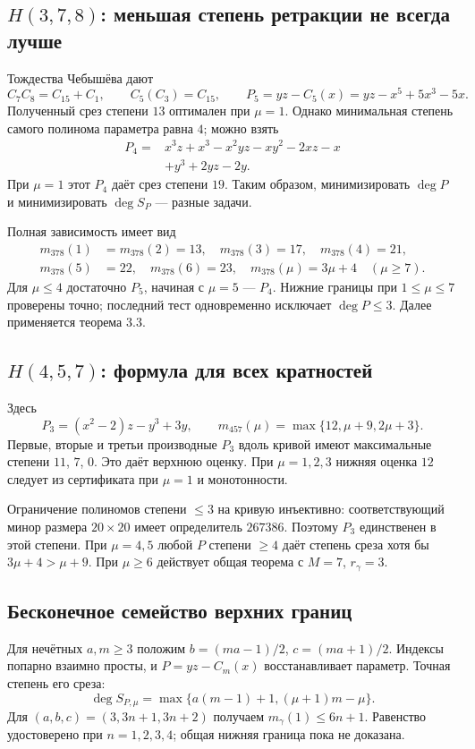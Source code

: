 \subsection*{$H(3,7,8)$: меньшая степень ретракции не всегда лучше}
Тождества Чебышёва дают
\[
C_7C_8=C_{15}+C_1,\qquad C_5(C_3)=C_{15},\qquad
P_5=yz-C_5(x)=yz-x^5+5x^3-5x.
\]
Полученный срез степени $13$ оптимален при $\mu=1$. Однако минимальная степень самого полинома параметра равна $4$; можно взять
\[
\begin{split}
P_4={}&x^3z+x^3-x^2yz-xy^2-2xz-x\\
&+y^3+2yz-2y.
\end{split}
\]
При $\mu=1$ этот $P_4$ даёт срез степени $19$. Таким образом, минимизировать $\deg P$ и минимизировать $\deg S_P$ --- разные задачи.

Полная зависимость имеет вид
\[
\boxed{\begin{aligned}
m_{378}(1)&=m_{378}(2)=13,\quad m_{378}(3)=17,\quad m_{378}(4)=21,\\
m_{378}(5)&=22,\quad m_{378}(6)=23,\quad
m_{378}(\mu)=3\mu+4\quad(\mu\ge7).
\end{aligned}}
\]
Для $\mu\le4$ достаточно $P_5$, начиная с $\mu=5$ --- $P_4$. Нижние границы при $1\le\mu\le7$ проверены точно; последний тест одновременно исключает $\deg P\le3$. Далее применяется теорема 3.3.

\subsection*{$H(4,5,7)$: формула для всех кратностей}
Здесь
\[
P_3=(x^2-2)z-y^3+3y,\qquad
\boxed{m_{457}(\mu)=\max\{12,\mu+9,2\mu+3\}.}
\]
Первые, вторые и третьи производные $P_3$ вдоль кривой имеют максимальные степени $11$, $7$, $0$. Это даёт верхнюю оценку. При $\mu=1,2,3$ нижняя оценка $12$ следует из сертификата при $\mu=1$ и монотонности.

Ограничение полиномов степени $\le3$ на кривую инъективно: соответствующий минор размера $20\times20$ имеет определитель $267386$. Поэтому $P_3$ единственен в этой степени. При $\mu=4,5$ любой $P$ степени $\ge4$ даёт степень среза хотя бы $3\mu+4>\mu+9$. При $\mu\ge6$ действует общая теорема с $M=7$, $r_\gamma=3$.

\subsection*{Бесконечное семейство верхних границ}
Для нечётных $a,m\ge3$ положим $b=(ma-1)/2$, $c=(ma+1)/2$. Индексы попарно взаимно просты, и $P=yz-C_m(x)$ восстанавливает параметр. Точная степень его среза:
\[
\deg S_{P,\mu}=\max\{a(m-1)+1,(\mu+1)m-\mu\}.
\]
Для $(a,b,c)=(3,3n+1,3n+2)$ получаем $m_\gamma(1)\le6n+1$. Равенство удостоверено при $n=1,2,3,4$; общая нижняя граница пока не доказана.

